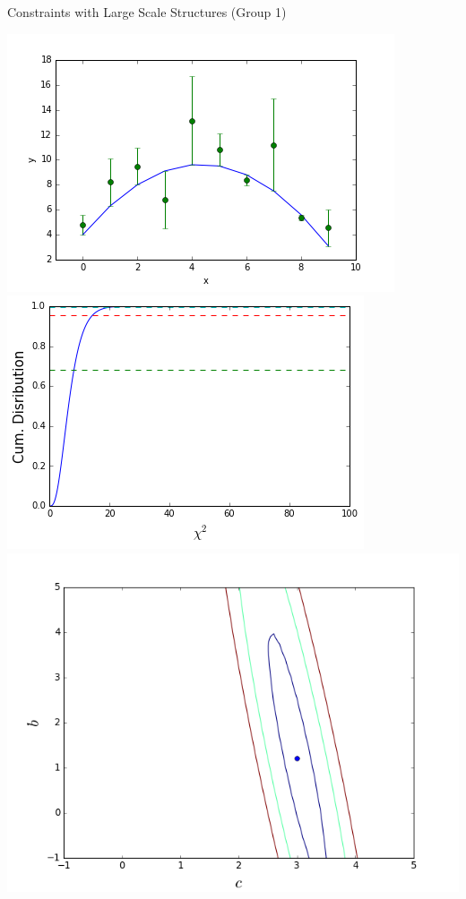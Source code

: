 \documentclass[a4paper,10pt]{beamer}
\begin{document}
\begin{frame}

 \begin{center}
 \huge{\color{blue}Constraints with Large Scale Structures (Group 1)}
 \end{center}

 \centering
  \includegraphics[scale=0.21]{bestfit}
  \includegraphics[scale=0.2]{sigmas}
  \includegraphics[scale=0.12]{contourcurve}

\end{frame}
\end{document}
